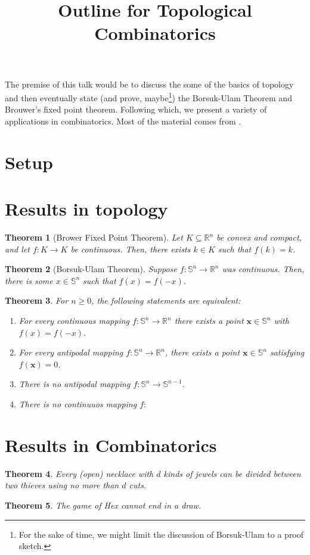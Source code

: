 \documentclass{amsart}
\newtheorem{thm}{Theorem}[section]
\theoremstyle{definition}
\begin{document}
\title{Outline for Topological Combinatorics}

\maketitle

The premise of this talk would be to discuss the some of the basics of topology and then eventually state (and prove, maybe\footnote{For the sake of time, we might limit the discussion of Borsuk-Ulam to a proof sketch.}) the Borsuk-Ulam Theorem and Brouwer's fixed point theorem. Following which, we present a variety of applications in combinatorics. Most of the material comes from \cite{topcombi}.\\

\section{Setup}

\section{Results in topology}

\begin{thm}[Brower Fixed Point Theorem]
    Let $K \subseteq \mathbb R^n$ be convex and compact, and let $f: K \to K$ be continuous. Then, there exists $k \in K$ such that $f(k) = k$.
\end{thm}

\begin{thm}[Borsuk-Ulam Theorem]
    Suppose $f: \mathbb S^n \to \mathbb R^n$ was continuous. Then, there is some $x \in \mathbb S^n$ such that $f(x) = f(-x)$.
\end{thm}

\begin{thm}
    For $n \geq 0$, the following statements are equivalent:
    \begin{enumerate}
        \item For every continuous mapping $f: \mathbb S^n \to \mathbb R^n$ there exists a point $\mathbf x \in \mathbb S^n$ with $f(x) = f(-x)$.
        \item For every antipodal mapping $f: \mathbb S^n \to \mathbb R^n$, there exists a point $\mathbf x \in \mathbb S^n$ satisfying $f(\mathbf x) = 0$.
        \item There is no antipodal mapping $f: \mathbb S^n \to \mathbb S^{n-1}$.
        \item There is no continuuos mapping $f: $
    \end{enumerate}
\end{thm}   

\section{Results in Combinatorics}

\begin{thm}
    Every (open) necklace with $d$ kinds of jewels can be divided between two thieves using no more than $d$ cuts.
\end{thm}

\begin{thm}
    The game of Hex cannot end in a draw.
\end{thm}


\vfill



\end{document}
